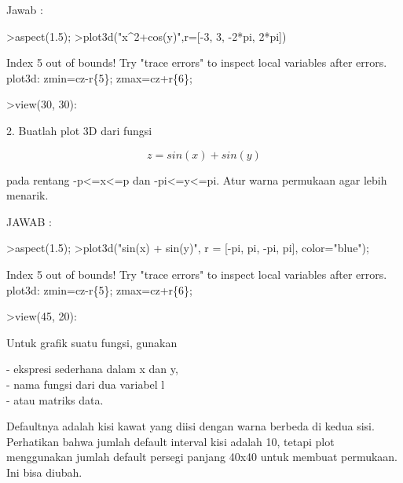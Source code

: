 \documentclass{article}
\begin{document}
\begin{eulernotebook}
\begin{eulercomment}
\begin{eulercomment}
\begin{eulercomment}
Jawab :
\end{eulercomment}
\begin{eulerprompt}
>aspect(1.5);
>plot3d("x^2+cos(y)",r=[-3, 3, -2*pi, 2*pi])
\end{eulerprompt}
\begin{euleroutput}
  Index 5 out of bounds!
  Try "trace errors" to inspect local variables after errors.
  plot3d:
      zmin=cz-r\{5\}; zmax=cz+r\{6\};
\end{euleroutput}
\begin{eulerprompt}
>view(30, 30):
\end{eulerprompt}
\begin{eulercomment}
2. Buatlah plot 3D dari fungsi \\
\end{eulercomment}
\begin{eulerformula}
\[
z=sin(x)+sin(y) 
\]
\end{eulerformula}
\begin{eulercomment}
pada rentang -p\textless{}=x\textless{}=p dan -pi\textless{}=y\textless{}=pi. Atur warna permukaan agar lebih
menarik.

JAWAB :
\end{eulercomment}
\begin{eulerprompt}
>aspect(1.5);
>plot3d("sin(x) + sin(y)", r = [-pi, pi, -pi, pi], color="blue");
\end{eulerprompt}
\begin{euleroutput}
  Index 5 out of bounds!
  Try "trace errors" to inspect local variables after errors.
  plot3d:
      zmin=cz-r\{5\}; zmax=cz+r\{6\};
\end{euleroutput}
\begin{eulerprompt}
>view(45, 20):
\end{eulerprompt}
\eulersubheading{}
\begin{eulercomment}
\begin{eulercomment}
\begin{eulercomment}
Untuk grafik suatu fungsi, gunakan

- ekspresi sederhana dalam x dan y,\\
- nama fungsi dari dua variabel l\\
- atau matriks data.

Defaultnya adalah kisi kawat yang diisi dengan warna berbeda di kedua
sisi. Perhatikan bahwa jumlah default interval kisi adalah 10, tetapi
plot menggunakan jumlah default persegi panjang 40x40 untuk membuat
permukaan. Ini bisa diubah.


\end{eulercomment}
\end{eulercomment}
\end{eulercomment}
\end{eulercomment}
\end{eulercomment}
\end{eulernotebook}
\end{document}
